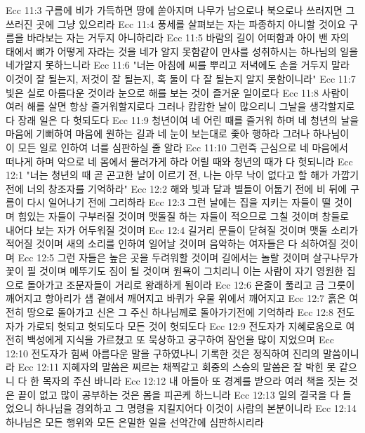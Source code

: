 Ecc 11:3  구름에 비가 가득하면 땅에 쏟아지며 나무가 남으로나 북으로나 쓰러지면 그 쓰러진 곳에 그냥 있으리라
Ecc 11:4  풍세를 살펴보는 자는 파종하지 아니할 것이요 구름을 바라보는 자는 거두지 아니하리라
Ecc 11:5  바람의 길이 어떠함과 아이 밴 자의 태에서 뼈가 어떻게 자라는 것을 네가 알지 못함같이 만사를 성취하시는 하나님의 일을 네가알지 못하느니라
Ecc 11:6  "너는 아침에 씨를 뿌리고 저녁에도 손을 거두지 말라 이것이 잘 될는지, 저것이 잘 될는지, 혹 둘이 다 잘 될는지 알지 못함이니라"
Ecc 11:7  빛은 실로 아름다운 것이라 눈으로 해를 보는 것이 즐거운 일이로다
Ecc 11:8  사람이 여러 해를 살면 항상 즐거워할지로다 그러나 캄캄한 날이 많으리니 그날을 생각할지로다 장래 일은 다 헛되도다
Ecc 11:9  청년이여 네 어린 때를 즐거워 하며 네 청년의 날을 마음에 기뻐하여 마음에 원하는 길과 네 눈이 보는대로 좇아 행하라 그러나 하나님이 이 모든 일로 인하여 너를 심판하실 줄 알라
Ecc 11:10  그런즉 근심으로 네 마음에서 떠나게 하며 악으로 네 몸에서 물러가게 하라 어릴 때와 청년의 때가 다 헛되니라
Ecc 12:1  "너는 청년의 때 곧 곤고한 날이 이르기 전, 나는 아무 낙이 없다고 할 해가 가깝기 전에 너의 창조자를 기억하라"
Ecc 12:2  해와 빛과 달과 별들이 어둡기 전에 비 뒤에 구름이 다시 일어나기 전에 그리하라
Ecc 12:3  그런 날에는 집을 지키는 자들이 떨 것이며 힘있는 자들이 구부러질 것이며 맷돌질 하는 자들이 적으므로 그칠 것이며 창들로 내어다 보는 자가 어두워질 것이며
Ecc 12:4  길거리 문들이 닫혀질 것이며 맷돌 소리가 적어질 것이며 새의 소리를 인하여 일어날 것이며 음악하는 여자들은 다 쇠하여질 것이며
Ecc 12:5  그런 자들은 높은 곳을 두려워할 것이며 길에서는 놀랄 것이며 살구나무가 꽃이 필 것이며 메뚜기도 짐이 될 것이며 원욕이 그치리니 이는 사람이 자기 영원한 집으로 돌아가고 조문자들이 거리로 왕래하게 됨이라
Ecc 12:6  은줄이 풀리고 금 그릇이 깨어지고 항아리가 샘 곁에서 깨어지고 바퀴가 우물 위에서 깨어지고
Ecc 12:7  흙은 여전히 땅으로 돌아가고 신은 그 주신 하나님께로 돌아가기전에 기억하라
Ecc 12:8  전도자가 가로되 헛되고 헛되도다 모든 것이 헛되도다
Ecc 12:9  전도자가 지혜로움으로 여전히 백성에게 지식을 가르쳤고 또 묵상하고 궁구하여 잠언을 많이 지었으며
Ecc 12:10  전도자가 힘써 아름다운 말을 구하였나니 기록한 것은 정직하여 진리의 말씀이니라
Ecc 12:11  지혜자의 말씀은 찌르는 채찍같고 회중의 스승의 말씀은 잘 박힌 못 같으니 다 한 목자의 주신 바니라
Ecc 12:12  내 아들아 또 경계를 받으라 여러 책을 짓는 것은 끝이 없고 많이 공부하는 것은 몸을 피곤케 하느니라
Ecc 12:13  일의 결국을 다 들었으니 하나님을 경외하고 그 명령을 지킬지어다 이것이 사람의 본분이니라
Ecc 12:14  하나님은 모든 행위와 모든 은밀한 일을 선악간에 심판하시리라


